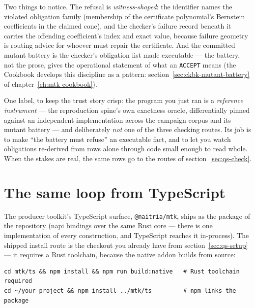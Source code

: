 

Two things to notice. The refusal is \emph{witness-shaped}: the
identifier names the violated obligation family (membership of the
certificate polynomial's Bernstein coefficients in the claimed cone),
and the checker's failure record beneath it carries the offending
coefficient's index and exact value, because failure geometry is
routing advice for whoever must repair the certificate. And the
committed mutant battery is the checker's obligation list made
executable --- the battery, not the prose, gives the operational
statement of what an \texttt{ACCEPT} means (the Cookbook develops
this discipline as a pattern:
section~\ref{sec:ckbk-mutant-battery} of
chapter~\ref{ch:mtk-cookbook}).

One label, to keep the trust story crisp: the program you
just ran is a \emph{reference instrument} --- the reproduction
spine's own exactness oracle, differentially pinned against an
independent implementation across the campaign corpus and its mutant
battery --- and deliberately \emph{not} one of the three checking
routes. Its job is to make ``the battery must refuse'' an executable
fact, and to let you watch obligations re-derived from rows alone
through code small enough to read whole. When the stakes are real,
the same rows go to the routes of section~\ref{sec:qs-check}.

\section{The same loop from TypeScript}
\label{sec:qs-typescript}

The producer toolkit's TypeScript surface, \texttt{@maitria/mtk},
ships as the  package of the 
repository (napi bindings over the same Rust core --- there is one
implementation of every construction, and TypeScript reaches it
in-process). The shipped install route is the checkout you already
have from section~\ref{sec:qs-setup} --- it requires a Rust
toolchain, because the native addon builds from source:

\begin{Verbatim}[fontsize=\small,frame=leftline,rulecolor=\color{accentmid},framesep=3mm,xleftmargin=3mm]
cd mtk/ts && npm install && npm run build:native   # Rust toolchain required
cd ~/your-project && npm install ../mtk/ts         # npm links the package
\end{Verbatim}

